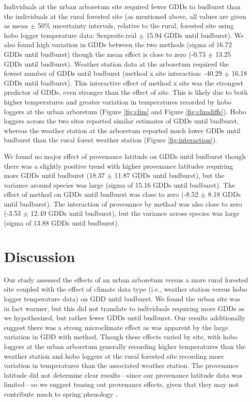 \documentclass{article}\usepackage[]{graphicx}\usepackage[]{color}
\begin{document}
Individuals at the urban arboretum site required fewer GDDs to budburst than the individuals at the rural forested site (as mentioned above, all values are given as mean $\pm$ 50\% uncertainty intervals, relative to the rural, forested site using hobo logger temperature data; Sexpr{site.real} $\pm$ 15.94 GDDs until budburst). We also found high variation in GDDs between the two methods (sigma of 16.72 GDDs until budburst) though the mean effect is close to zero (-0.73 $\pm$ 13.25 GDDs until budburst). Weather station data at the arboretum required the fewest number of GDDs until budburst (method x site interaction: -40.29 $\pm$ 16.18 GDDs until budburst). This interactive effect of method x site was the strongest predictor of GDDs, even stronger than the effect of site. This is likely due to both higher temperatures and greater variation in temperatures recorded by hobo loggers at the urban arboretum (Figure \ref{fig:clim} and Figure \ref{fig:climdiffs}). Hobo loggers across the two sites reported similar estimates of GDDs until budburst, whereas the weather station at the arboretum reported much lower GDDs until budburst than the rural forest weather station (Figure \ref{fig:interaction}).

We found no major effect of provenance latitude on GDDs until budburst though there was a slightly positive trend with higher provenance latitudes requiring more GDDs until budburst (18.37 $\pm$ 11.87 GDDs until budburst), but the variance around species was large (sigma of 15.16 GDDs until budburst). The effect of method on GDDs until budburst was close to zero (-8.52 $\pm$ 8.18 GDDs until budburst). The interaction of provenance by method was also close to zero (-3.53 $\pm$ 12.49 GDDs until budburst), but the variance across species was large (sigma of 13.88 GDDs until budburst).

\section*{Discussion} 

Our study assessed the effects of an urban arboretum versus a more rural forested site coupled with the effect of climate data type (i.e., weather station versus hobo logger temperature data) on GDD until budburst. We found the urban site was in fact warmer, but this did not translate to individuals requiring more GDDs as we hypothesized, but rather fewer GDDs until budburst. Our results additionally suggest there was a strong microclimate effect as was apparent by the large variation in GDD with method. Though these effects varied by site, with hobo loggers at the urban arboretum generally recording higher temperatures than the weather station and hobo loggers at the rural forested site recording more variation in temperatures than the associated weather station. The provenance latitude did not determine clear results---since our provenance latitude data was limited---so we suggest teasing out provenance effects, given that they may not contribute much to spring phenology \citep{Gauzere2017}. 
\end{document}
